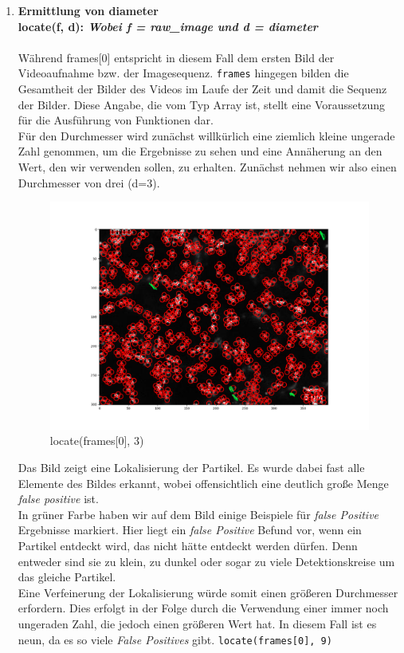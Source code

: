 	\begin{enumerate}
    			\item {\large \textbf{Ermittlung von diameter}}\\
    			\textbf{locate(f, d): \textit{Wobei f = raw\_image und d = diameter}} \\ \\
    			 Während frames[0] entspricht in diesem Fall dem ersten Bild der Videoaufnahme bzw. der Imagesequenz. \texttt{frames} hingegen bilden die Gesamtheit der Bilder des Videos im Laufe der Zeit und damit die Sequenz der Bilder.  Diese Angabe, die vom Typ Array ist, stellt eine Voraussetzung für die Ausführung von Funktionen dar. \\
    			 Für den Durchmesser wird zunächst willkürlich eine ziemlich kleine ungerade Zahl genommen, um die Ergebnisse zu sehen und eine Annäherung an den Wert, den wir verwenden sollen, zu erhalten. Zunächst nehmen wir also einen Durchmesser von drei (d=3).  
    			 
\begin{figure}[H]
    \centering
    \includegraphics[scale=0.35]{Grafiken/trackpyBilder/locate(f0, diameter=3).png}
    \caption{locate(frames[0], 3)}
    \label{fig:bild_label}
\end{figure} 

Das Bild zeigt eine Lokalisierung der Partikel. Es wurde dabei fast alle Elemente des Bildes erkannt, wobei offensichtlich eine deutlich große Menge \textit{\gls{false positive}} ist.\\
In grüner Farbe haben wir auf dem Bild einige Beispiele für \textit{false Positive} Ergebnisse markiert. 
Hier liegt ein \textit{false Positive} Befund vor, wenn ein Partikel entdeckt wird, das nicht hätte entdeckt werden dürfen. Denn entweder sind sie zu klein, zu dunkel oder sogar zu viele Detektionskreise um das gleiche Partikel.  
\\
Eine Verfeinerung der Lokalisierung würde somit einen größeren Durchmesser erfordern. Dies erfolgt in der Folge durch die Verwendung einer immer noch ungeraden Zahl, die jedoch einen größeren Wert hat. In diesem Fall ist es neun, da es so viele \textit{False Positives} gibt. 
\texttt{locate(frames[0], 9)}


\end{enumerate}
